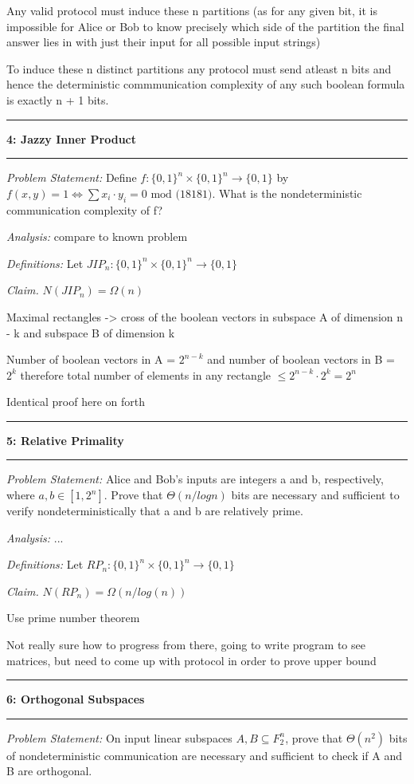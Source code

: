 \documentclass[11pt]{article}
\newcommand\question[2]{\vspace{.25in}\hrule\textbf{#1: #2}\vspace{.5em}\hrule\vspace{.10in}}
\newcommand\analysis{\vspace{.10in}\emph{Analysis: }\newline}
\newcommand\problem{\emph{Problem Statement:}\newline}
\newcommand\definitions{\emph{Definitions:}\newline}
\newcommand\claim{\emph{Claim.}\newline}
\begin{document}
Any valid protocol must induce these n partitions (as for any given bit, it is impossible for Alice or Bob to know precisely which side of the partition the final answer lies in with just their input for all possible input strings)

To induce these n distinct partitions any protocol must send atleast n bits and hence the deterministic commmunication complexity of any such boolean formula is exactly n + 1 bits. 

\newpage

\question{4}{Jazzy Inner Product}

\problem
Define $f: {\{0, 1\}}^n \times {\{0, 1\}}^n \to \{0, 1\}$ by $f(x, y) = 1 \iff \sum{x_i \cdot y_i} = 0 \text{ mod (18181)}.$ What is the nondeterministic communication complexity of f?

\analysis
compare to known problem 

\definitions
Let $JIP_n: {\{0, 1\}}^n \times {\{0, 1\}}^n \to \{0, 1\}$

\claim
$N(JIP_n) = \Omega(n)$ 

\proof 
Maximal rectangles -> cross of the boolean vectors in subspace A of dimension n - k and subspace B of dimension k 

Number of boolean vectors in A = $2^{n - k}$ and number of boolean vectors in B = $2^{k}$ therefore total number of elements in any rectangle $\leq 2^{n - k} \cdot 2^{k} = 2^n$ 

Identical proof here on forth

\newpage

\question{5}{Relative Primality}

\problem
Alice and Bob’s inputs are integers a and b, respectively, where $a, b \in [1, 2^n]$. Prove that $\Theta(n/ log n)$ bits are necessary and sufficient to verify nondeterministically that a and b are relatively prime.

\analysis
... 

\definitions
Let $RP_n: {\{0, 1\}}^n \times {\{0, 1\}}^n \to \{0, 1\}$

\claim
$N(RP_n) = \Omega(n/log(n))$ 

\proof 
Use prime number theorem

Not really sure how to progress from there, going to write program to see matrices, but need to come up with protocol in order to prove upper bound

\newpage

\question{6}{Orthogonal Subspaces}

\problem
On input linear subspaces $A, B \subseteq F^n_2$, prove that $\Theta(n^2)$ bits of nondeterministic communication are necessary and sufficient to check if A and B are orthogonal.
\end{document}
